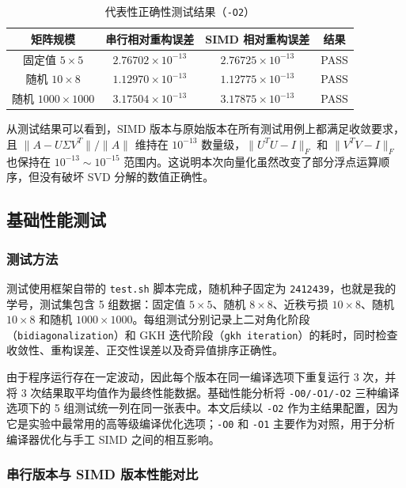 \documentclass[UTF8,a4paper]{ctexart}
\begin{document}
\begin{table}[H]
  \centering
  \begin{tabular}{cccc}
    \toprule
    矩阵规模 & 串行相对重构误差 & SIMD 相对重构误差 & 结果 \\
    \midrule
    固定值 $5\times5$ & $2.76702\times10^{-13}$ & $2.76725\times10^{-13}$ & PASS \\
    随机 $10\times8$ & $1.12970\times10^{-13}$ & $1.12775\times10^{-13}$ & PASS \\
    随机 $1000\times1000$ & $3.17504\times10^{-13}$ & $3.17875\times10^{-13}$ & PASS \\
    \bottomrule
  \end{tabular}
  \caption{代表性正确性测试结果（\texttt{-O2}）}
  \label{tab:correctness}
\end{table}

从测试结果可以看到，SIMD 版本与原始版本在所有测试用例上都满足收敛要求，且 \(\|A-U\Sigma V^T\|/\|A\|\) 维持在 \(10^{-13}\) 数量级，\(\|U^TU-I\|_F\) 和 \(\|V^TV-I\|_F\) 也保持在 \(10^{-13}\sim10^{-15}\) 范围内。这说明本次向量化虽然改变了部分浮点运算顺序，但没有破坏 SVD 分解的数值正确性。

\subsection{基础性能测试}

\subsubsection{测试方法}
测试使用框架自带的 \texttt{test.sh} 脚本完成，随机种子固定为 \texttt{2412439}，也就是我的学号，测试集包含 5 组数据：固定值 \(5\times5\)、随机 \(8\times8\)、近秩亏损 \(10\times8\)、随机 \(10\times8\) 和随机 \(1000\times1000\)。每组测试分别记录上二对角化阶段（\texttt{bidiagonalization}）和 GKH 迭代阶段（\texttt{gkh iteration}）的耗时，同时检查收敛性、重构误差、正交性误差以及奇异值排序正确性。

由于程序运行存在一定波动，因此每个版本在同一编译选项下重复运行 3 次，并将 3 次结果取平均值作为最终性能数据。基础性能分析将 \texttt{-O0/-O1/-O2} 三种编译选项下的 5 组测试统一列在同一张表中。本文后续以 \texttt{-O2} 作为主结果配置，因为它是实验中最常用的高等级编译优化选项；\texttt{-O0} 和 \texttt{-O1} 主要作为对照，用于分析编译器优化与手工 SIMD 之间的相互影响。

\subsubsection{串行版本与 SIMD 版本性能对比}
\end{document}
